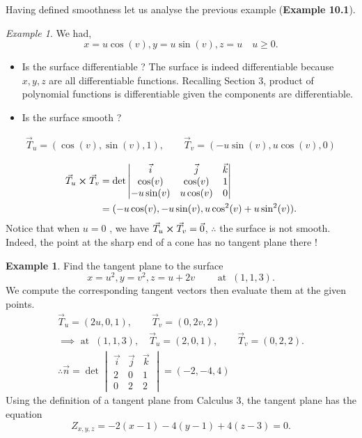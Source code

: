 \documentclass[
	12pt,
	]{article}
\theoremstyle{custom}
\theoremstyle{custom}
\theoremstyle{custom}
\theoremstyle{custom}
\theoremstyle{custom}
\theoremstyle{definition}
\newtheorem{example}{Example}[section]
\theoremstyle{example}
\theoremstyle{note}
\theoremstyle{remark}
\theoremstyle{example}
\newtheorem*{example*}{Example}
\newcounter{theo}[section]\setcounter{theo}{0}
\numberwithin{equation}{subsection}
\begin{document}
				\noindent Having defined smoothness let us analyse the previous example (\textbf{Example 10.1}).
				\begin{example*}
					We had,
						$$ x = u\cos (v) , y= u \sin (v) , z = u \quad u\ge 0.$$
					\begin{itemize}
						\item Is the surface differentiable ? The surface is indeed differentiable because $x,y,z$ are all differentiable functions. Recalling Section 3, product of polynomial functions is differentiable given the components are differentiable.
						\item Is the surface smooth ? 
					\end{itemize}
					\begin{gather*}
						\vec{T}_{u} = (\cos(v),\sin(v),1) ,\qquad \vec{T}_{v} = (-u\sin(v), u\cos(v), 0)\\
					\end{gather*}
					\vspace{-1.5cm}
					\begin{align*}
						\vec{T}_{u} \cross \vec{T}_{v} &= \det 
						\begin{vmatrix}
							\vec{i} & \vec{j} & \vec{k} \\
							\cos(v) & \cos(v) & 1 \\
							-u\sin(v) & u\cos(v) & 0
						\end{vmatrix} \\
						&= (-u \cos(v) ,-u\sin(v), u\cos^{2}(v) + u\sin^{2}(v)).
					\end{align*}
					Notice that when $u=0$ , we have $\vec{T}_{u} \cross \vec{T}_{v} = \vec{0}$, $\therefore$ the surface is not smooth. Indeed, the point at the sharp end of a cone has no tangent plane there !
				\end{example*}
				\begin{example}
					Find the tangent plane to the surface 
					$$ x = u^{2} , y=v^{2} , z= u+2v \qquad \text{ at } \ (1,1,3).$$
					We compute the corresponding tangent vectors then evaluate them at the given points.
					\begin{gather*}
						\vec{T}_{u} = (2u , 0 ,1) ,\qquad \vec{T}_{v} = (0,2v,2) \\
						\implies \text{ at } \ (1,1,3) ,\quad \vec{T}_{u} =(2,0,1) ,\qquad \vec{T}_{v}=(0,2,2).\\
						\therefore \vec{n} = \det 
						\begin{vmatrix}
							\vec{i} & \vec{j} &\vec{k} \\
							2 & 0 & 1 \\
							0& 2&2
						\end{vmatrix} =(-2,-4,4)
					\end{gather*}
					Using the definition of a tangent plane from Calculus 3, the tangent plane has the equation 
					$$ Z_{x,y,z} = -2(x-1) -4(y-1) + 4(z-3) =0.$$
				\end{example}
				
\end{document}
